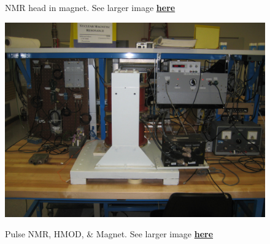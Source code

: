 \documentclass{../lab}
\begin{document}
\begin{figure}[h]
\begin{minipage}{0.32\textwidth}
    \caption{NMR head in magnet. See larger image \href{http://experimentationlab.berkeley.edu/sites/default/files/images/NMR_Head-in-Magnet_3560.jpg}{\textbf{here}}}
\end{minipage}
\begin{minipage}{0.32\textwidth}
    \href{http://experimentationlab.berkeley.edu/sites/default/files/images/PNMR_3494.jpg}{\includegraphics[width=\linewidth,keepaspectratio]{images/PNMR_3494.jpg}}
    \caption{Pulse NMR, HMOD, & Magnet. See larger image \href{http://experimentationlab.berkeley.edu/sites/default/files/images/PNMR_3494.jpg}{\textbf{here}}}
\end{minipage}
\begin{minipage}{0.32\textwidth}

\end{minipage}
\end{figure}
\end{document}
